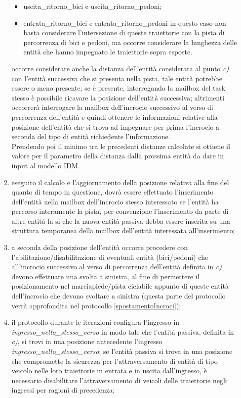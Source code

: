 \begin{enumerate}
\begin{enumerate}
\begin{itemize}
\item usci\-ta\_ri\-tor\-no\_bi\-ci e usci\-ta\_ri\-tor\-no\_pe\-do\-ni;
\item en\-tra\-ta\_ritorno\_bici e en\-tra\-ta\_ri\-tor\-no\_pe\-do\-ni in questo caso non basta considerare l'intersezione di queste traiettorie con la pista di percorrenza di bici e pedoni, ma occorre considerare la lunghezza delle entità che hanno impegnato le traiettorie sopra esposte.
\end{itemize}
occorre considerare anche la distanza dell'entità considerata al punto \textit{c)} con l'entità successiva che si presenta nella pista, tale entità potrebbe essere o meno presente; se è presente, interrogando la mailbox del task stesso è possibile ricavare la posizione dell'entità successiva; altrimenti occorrerà interrogare la mailbox dell'incrocio successivo al verso di percorrenza dell'entità e quindi ottenere le informazioni relative alla posizione dell'entità che si trova ad impegnare per prima l'incrocio a seconda del tipo di entità richiedente l'informazione.\\
Prendendo poi il minimo tra le precedenti distanze calcolate si ottiene il valore per il parametro della distanza dalla prossima entità da dare in input al modello \ac{IDM}.
\item eseguito il calcolo e l'aggiornamento della posizione relativa alla fine del quanto di tempo in questione, dovrà essere effettuato l'inserimento dell'entità nella mailbox dell'incrocio stesso interessato se l'entità ha percorso interamente la pista, per convenzione l'inserimento da parte di altre entità fa si che la nuova entità passiva debba essere inserita su una struttura temporanea della mailbox dell'entità interessata all'inserimento;
\item a seconda della posizione dell'entità occorre procedere con l'abilitazione/disabilitazione di eventuali entità (bici/pedoni) che all'incrocio successivo al verso di percorrenza dell'entità definita in \textit{c)} devono effettuare una svolta a sinistra, al fine di permettere il posizionamento nel marciapiede/pista ciclabile appunto di queste entità dell'incrocio che devono svoltare a sinistra (questa parte del protocollo verrà approfondita nel protocollo \ref{spostamentoIncroci});
\item il protocollo durante le iterazioni configura l'ingresso in \textit{ingres\-so\_nel\-lo\_stes\-so\_ver\-so} in modo tale che l'entità passiva, definita in \textit{c)}, si trovi in una posizione antecedente l'ingresso \textit{ingres\-so\_nel\-lo\_stes\-so\_ver\-so}; se l'entità passiva si trova in una posizione che compromette la sicurezza per l'attraversamento di entità di tipo veicolo nelle loro traiettorie in entrata e in uscita dall'ingresso, è necessario disabilitare l'attraversamento di veicoli delle traiettorie negli ingressi per ragioni di precedenza;

\end{enumerate}
\end{enumerate}
